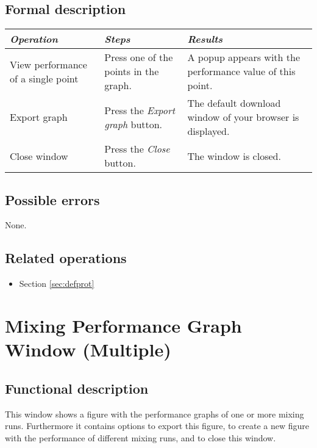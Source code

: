   \subsection*{Formal description}
    \begin{tabularx}{\textwidth}{XXX}
    \toprule
    \emph{Operation} & \emph{Steps} & \emph{Results} \\
    \midrule
    View performance of a single point & Press one of the points in the graph. & A popup appears with the performance value of this point. \\
    \midrule
    Export graph & Press the \emph{Export graph} button. & The default download window of your browser is displayed. \\
    \midrule
    Close window & Press the \emph{Close} button. & The window is closed. \\
    \bottomrule
\end{tabularx}

  \subsection*{Possible errors}
  None.

  \subsection*{Related operations}
   \begin{itemize}
   \item Section \ref{sec:defprot}
  \end{itemize}

\section{Mixing Performance Graph Window (Multiple)}
\label{sec:mulperfgraph}
  \subsection*{Functional description}
  This window shows a figure with the performance graphs of one or more mixing runs. Furthermore it contains options to export this figure, to create a new figure with the performance of different mixing runs, and to close this window.


